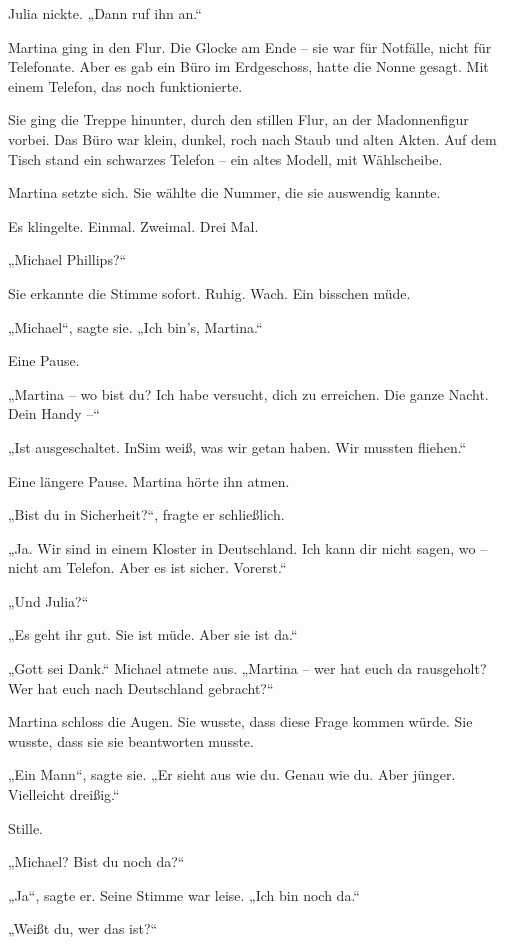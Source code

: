 \documentclass[
]{article}
\begin{document}
Julia nickte. „Dann ruf ihn an.``

Martina ging in den Flur. Die Glocke am Ende -- sie war für Notfälle, nicht für Telefonate. Aber es gab ein Büro im Erdgeschoss, hatte die Nonne gesagt. Mit einem Telefon, das noch funktionierte.

Sie ging die Treppe hinunter, durch den stillen Flur, an der Madonnenfigur vorbei. Das Büro war klein, dunkel, roch nach Staub und alten Akten. Auf dem Tisch stand ein schwarzes Telefon -- ein altes Modell, mit Wählscheibe.

Martina setzte sich. Sie wählte die Nummer, die sie auswendig kannte.

Es klingelte. Einmal. Zweimal. Drei Mal.

„Michael Phillips?{\kern0pt}``

Sie erkannte die Stimme sofort. Ruhig. Wach. Ein bisschen müde.

„Michael``, sagte sie. „Ich bin's, Martina.``

Eine Pause.

„Martina -- wo bist du? Ich habe versucht, dich zu erreichen. Die ganze Nacht. Dein Handy --``

„Ist ausgeschaltet. InSim weiß, was wir getan haben. Wir mussten fliehen.``

Eine längere Pause. Martina hörte ihn atmen.

„Bist du in Sicherheit?{\kern0pt}``, fragte er schließlich.

„Ja. Wir sind in einem Kloster in Deutschland. Ich kann dir nicht sagen, wo -- nicht am Telefon. Aber es ist sicher. Vorerst.``

„Und Julia?{\kern0pt}``

„Es geht ihr gut. Sie ist müde. Aber sie ist da.``

„Gott sei Dank.`` Michael atmete aus. „Martina -- wer hat euch da rausgeholt? Wer hat euch nach Deutschland gebracht?{\kern0pt}``

Martina schloss die Augen. Sie wusste, dass diese Frage kommen würde. Sie wusste, dass sie sie beantworten musste.

„Ein Mann``, sagte sie. „Er sieht aus wie du. Genau wie du. Aber jünger. Vielleicht dreißig.``

Stille.

„Michael? Bist du noch da?{\kern0pt}``

„Ja``, sagte er. Seine Stimme war leise. „Ich bin noch da.``

„Weißt du, wer das ist?{\kern0pt}``
\end{document}
